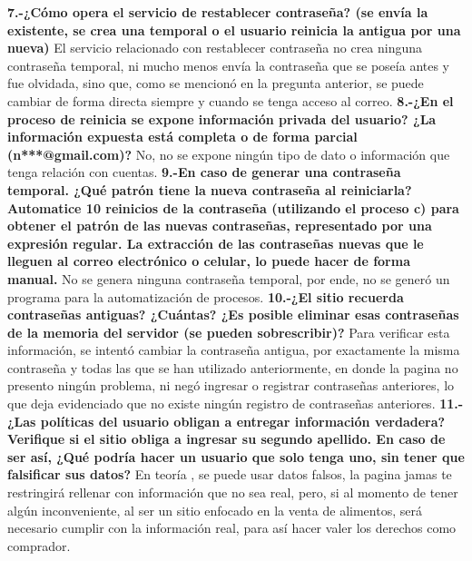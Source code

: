 \documentclass{article}
\begin{document}
\newline
\textbf{7.-¿Cómo opera el servicio de restablecer contraseña? (se envía la existente, se crea una temporal o el usuario reinicia la antigua por una nueva)}
\newline
El servicio relacionado con restablecer contraseña no crea ninguna contraseña temporal, ni mucho menos envía la contraseña que se poseía antes y fue olvidada, sino que, como se mencionó en la pregunta anterior, se puede cambiar de forma directa siempre y cuando se tenga acceso al correo.
\newline
\textbf{ 8.-¿En el proceso de reinicia se expone información privada del usuario? ¿La información expuesta está completa o de forma parcial (n***@gmail.com)?}
\newline
No, no se expone ningún tipo de dato o información que tenga relación con cuentas.
\newline
\textbf{9.-En caso de generar una contraseña temporal. ¿Qué patrón tiene la nueva contraseña al reiniciarla? Automatice 10 reinicios de la contraseña (utilizando el proceso c) para obtener el patrón de las nuevas contraseñas, representado por una expresión regular. La extracción de las contraseñas nuevas que le lleguen al correo electrónico o celular, lo puede hacer de forma manual.}
\newline
No se genera ninguna contraseña temporal, por ende, no se generó un programa para la automatización de procesos.
\newline
\textbf{10.-¿El sitio recuerda contraseñas antiguas? ¿Cuántas? ¿Es posible eliminar esas contraseñas de la memoria del servidor (se pueden sobrescribir)?}
\newline
Para verificar esta información, se intentó cambiar la contraseña antigua, por exactamente la misma contraseña y todas las que se han utilizado anteriormente, en donde la pagina no presento ningún problema, ni negó ingresar o registrar contraseñas anteriores, lo que deja evidenciado que no existe ningún registro de contraseñas anteriores. 
\newline
\textbf{11.-¿Las políticas del usuario obligan a entregar información verdadera? Verifique si el sitio obliga a ingresar su segundo apellido. En caso de ser así, ¿Qué podría hacer un usuario que solo tenga uno, sin tener que falsificar sus datos?}
\newline
En teoría , se puede usar datos falsos, la pagina jamas te restringirá rellenar con información que no sea real, pero, si al momento de tener algún inconveniente, al ser un sitio enfocado en la venta de alimentos, será necesario cumplir con la información real, para así hacer valer los derechos como comprador.
\end{document}
